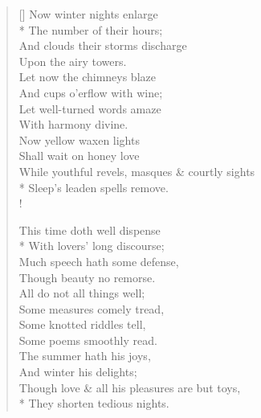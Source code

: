 \documentclass[MAIN]{subfiles}
\begin{document}
\settowidth{\versewidth}{While youthful revels, masques \& courtly sights}
\begin{verse}[\versewidth]
\vin Now winter nights enlarge\\*
\vin \vin The number of their hours;\\
\vin And clouds their storms discharge\\
\vin \vin Upon the airy towers.\\
\vin Let now the chimneys blaze\\
\vin \vin And cups o'erflow with wine;\\
\vin Let well-turned words amaze\\
\vin With harmony divine.\\
\vin Now yellow waxen lights\\
\vin \vin Shall wait on honey love\\
While youthful revels, masques \& courtly sights\\*
\vin \vin Sleep's leaden spells remove.\\!

\vin This time doth well dispense\\*
\vin \vin With lovers' long discourse;\\
\vin Much speech hath some defense,\\
\vin \vin Though beauty no remorse.\\
\vin All do not all things well;\\
\vin \vin Some measures comely tread,\\
\vin Some knotted riddles tell,\\
\vin \vin Some poems smoothly read.\\
\vin The summer hath his joys,\\
\vin \vin And winter his delights;\\
Though love \& all his pleasures are but toys,\\*
\vin \vin They shorten tedious nights.
\end{verse}
\end{document}
